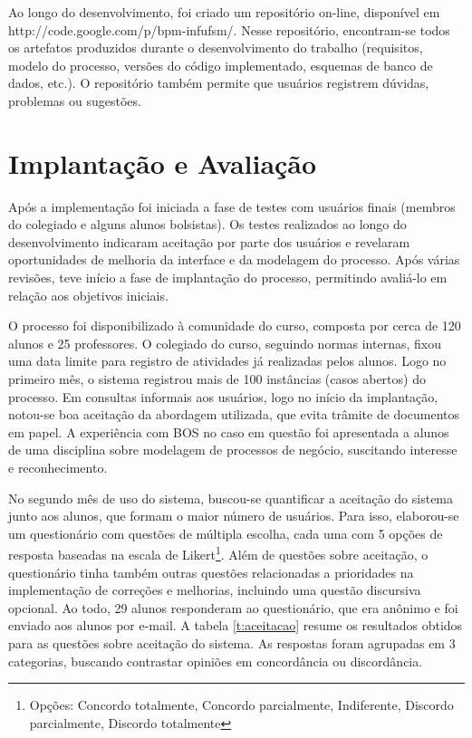\documentclass[12pt]{article}
\begin{document}
Ao longo do desenvolvimento, foi criado um repositório on-line, disponível em http://code.google.com/p/bpm-infufsm/. Nesse repositório, encontram-se todos os artefatos produzidos durante o desenvolvimento do trabalho (requisitos, modelo do processo, versões do código implementado, esquemas de banco de dados, etc.). O repositório também permite que usuários registrem dúvidas, problemas ou sugestões.



\section{Implantação e Avaliação}

Após a implementação foi iniciada a fase de testes com usuários finais (membros do colegiado e alguns alunos bolsistas). Os testes realizados ao longo do desenvolvimento indicaram aceitação por parte dos usuários e revelaram oportunidades de melhoria da interface e da modelagem do processo. Após várias revisões, teve início a fase de implantação do processo, permitindo avaliá-lo em relação aos objetivos iniciais.

O processo foi disponibilizado à comunidade do curso, composta por cerca de 120 alunos e 25 professores. O colegiado do curso, seguindo normas internas, fixou uma data limite para registro de atividades já realizadas pelos alunos. Logo no primeiro mês, o sistema registrou mais de 100 instâncias (casos abertos) do processo. Em consultas informais aos usuários, logo no início da implantação, notou-se boa aceitação da abordagem utilizada, que evita trâmite de documentos em papel.
A experiência com BOS no caso em questão foi apresentada a alunos de uma disciplina sobre modelagem de processos de negócio, suscitando interesse e reconhecimento.


No segundo mês de uso do sistema, buscou-se quantificar a aceitação do sistema junto aos alunos, que formam o maior número de usuários. Para isso, elaborou-se um questionário com questões de múltipla escolha, cada uma com 5 opções de resposta baseadas na escala de Likert\footnote{Opções: Concordo totalmente, Concordo parcialmente, Indiferente, Discordo parcialmente, Discordo totalmente}. Além de questões sobre aceitação, o questionário tinha também outras questões relacionadas a prioridades na implementação de correções e melhorias, incluindo uma questão discursiva opcional. Ao todo, 29 alunos responderam ao questionário, que era anônimo e foi enviado aos alunos por e-mail. A tabela \ref{t:aceitacao} resume os resultados obtidos para as questões sobre aceitação do sistema. As respostas foram agrupadas em 3 categorias, buscando contrastar opiniões em concordância ou discordância.
\end{document}
